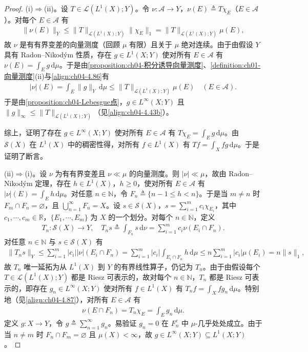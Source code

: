 \documentclass[../../main.tex]{subfiles}%
\begin{document}
\begin{proof}
(i)$\Rightarrow$(ii)。设 $T\in\mathcal{L}(L^1(X);Y)$。令 $\nu:\mathcal{A}\to Y$，$\nu(E)\triangleq T\chi_E$（$E\in\mathcal{A}$）。对每个 $E\in\mathcal{A}$ 有
\begin{align}
\|\nu(E)\|_Y\leqslant\|T\|_{\mathcal{L}(L^1(X);Y)}\|\chi_E\|_1=\|T\|_{\mathcal{L}(L^1(X);Y)}\mu(E), \label{align:ch04-4.86}
\end{align}
故 $\nu$ 是有有界变差的向量测度（回顾 $\mu$ 有限）且关于 $\mu$ 绝对连续。由于由假设 $Y$ 具有 Radon--Nikodým 性质，存在 $g\in L^1(X;Y)$ 使对所有 $E\in\mathcal{A}$ 有 $\nu(E)=\int_E g\,\mathrm{d}\mu$。于是由\cref{proposition:ch04-积分诱导向量测度}、\cref{definition:ch01-向量测度}(ii)与\eqref{align:ch04-4.86}有
\begin{align*}
|\nu|(E)=\int_E\|g\|_Y\,\mathrm{d}\mu\leqslant\|T\|_{\mathcal{L}(L^1(X);Y)}\mu(E)\quad(E\in\mathcal{A}).
\end{align*}
于是由\cref{proposition:ch04-Lebesgue点}，$g\in L^\infty(X;Y)$ 且 $\|g\|_\infty\leqslant\|T\|_{\mathcal{L}(L^1(X);Y)}$（见\eqref{align:ch04-4.43b}）。

综上，证明了存在 $g\in L^\infty(X;Y)$ 使对所有 $E\in\mathcal{A}$ 有 $T\chi_E=\int_E g\,\mathrm{d}\mu$。由 $\mathcal{S}(X)$ 在 $L^1(X)$ 中的稠密性得，对所有 $f\in L^1(X)$ 有 $Tf=\int_X fg\,\mathrm{d}\mu$。于是证明了断言。

(ii)$\Rightarrow$(i)。设 $\nu$ 为有有界变差且 $\nu\ll\mu$ 的向量测度。则 $|\nu|\ll\mu$，故由 Radon--Nikodým 定理，存在 $h\in L^1(X)$，$h\geqslant0$，使对所有 $E\in\mathcal{A}$ 有 $|\nu|(E)=\int_E h\,\mathrm{d}\mu$。对任意 $n\in\mathbb{N}$，令 $F_n\triangleq\{n-1\leqslant h<n\}$。于是当 $m\neq n$ 时 $F_m\cap F_n=\varnothing$，且 $\bigcup_{n=1}^\infty F_n=X$。设 $s\in\mathcal{S}(X)$，$s=\sum_{i=1}^mc_i\chi_{E_i}$，其中 $c_1,\cdots,c_m\in\mathbb{R}$，$\{E_1,\cdots,E_m\}$ 为 $X$ 的一个划分。对每个 $n\in\mathbb{N}$，定义
\begin{align}
T_n:\mathcal{S}(X)\to Y,\quad T_ns\triangleq \int_{F_n}s\,\mathrm{d}\nu=\sum_{i=1}^mc_i\nu(E_i\cap F_n). \label{align:ch04-4.87}
\end{align}
对任意 $n\in\mathbb{N}$ 与 $s\in\mathcal{S}(X)$ 有
\begin{align*}
\|T_ns\|_Y\leqslant\sum_{i=1}^m|c_i||\nu|(E_i\cap F_n)=\sum_{i=1}^m|c_i|\int_{E_i\cap F_n}h\,\mathrm{d}\mu\leqslant n\sum_{i=1}^m|c_i|\mu(E_i)=n\|s\|_1,
\end{align*}
故 $T_n$ 唯一延拓为从 $L^1(X)$ 到 $Y$ 的有界线性算子，仍记为 $T_n$。由于由假设每个 $T\in\mathcal{L}(L^1(X);Y)$ 都是 Riesz 可表示的，故对每个 $n\in\mathbb{N}$，$T_n$ 都是 Riesz 可表示的，即存在 $g_n\in L^\infty(X;Y)$ 使对所有 $f\in L^1(X)$ 有 $T_nf=\int_X fg_n\,\mathrm{d}\mu$。特别地（见\eqref{align:ch04-4.87}），对所有 $E\in\mathcal{A}$ 有
\begin{align}
\nu(E\cap F_n)=T_n\chi_E=\int_E g_n\,\mathrm{d}\mu. \label{align:ch04-4.88}
\end{align}
定义 $g:X\to Y$，令 $g\triangleq\sum_{n=1}^\infty g_n$。易验证 $g_n=0$ 在 $F_n^c$ 中 $\mu$-几乎处处成立。由于当 $n\neq m$ 时 $F_n\cap F_m=\varnothing$ 且 $\mu(X)<\infty$，故 $g\in L^\infty(X;Y)\subseteq L^1(X;Y)$。


\end{proof}
\end{document}
